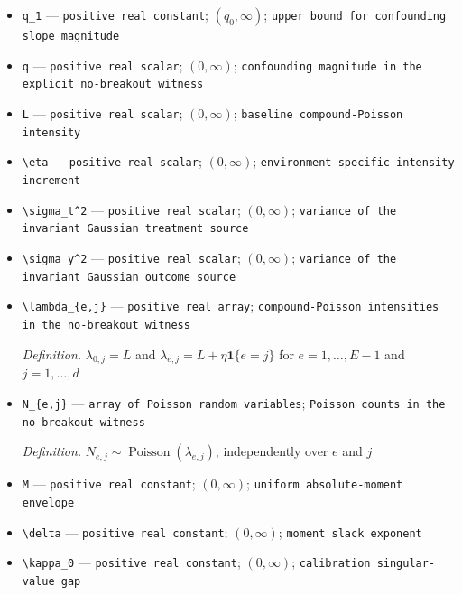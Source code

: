 \documentclass{article}
\begin{document}
\begin{itemize}
  \item \texttt{q\_\allowbreak{}1} --- \texttt{positive real constant}; \((q_0,\infty)\); \texttt{upper bound for confounding slope magnitude}
  \item \texttt{q} --- \texttt{positive real scalar}; \((0,\infty)\); \texttt{confounding magnitude in the explicit no-\allowbreak{}breakout witness}
  \item \texttt{L} --- \texttt{positive real scalar}; \((0,\infty)\); \texttt{baseline compound-\allowbreak{}Poisson intensity}
  \item \texttt{\textbackslash{}\allowbreak{}eta} --- \texttt{positive real scalar}; \((0,\infty)\); \texttt{environment-\allowbreak{}specific intensity increment}
  \item \texttt{\textbackslash{}\allowbreak{}sigma\_\allowbreak{}t\textasciicircum{}2} --- \texttt{positive real scalar}; \((0,\infty)\); \texttt{variance of the invariant Gaussian treatment source}
  \item \texttt{\textbackslash{}\allowbreak{}sigma\_\allowbreak{}y\textasciicircum{}2} --- \texttt{positive real scalar}; \((0,\infty)\); \texttt{variance of the invariant Gaussian outcome source}
  \item \texttt{\textbackslash{}\allowbreak{}lambda\_\allowbreak{}\{e,\allowbreak{}j\}\allowbreak{}} --- \texttt{positive real array}; \texttt{compound-\allowbreak{}Poisson intensities in the no-\allowbreak{}breakout witness}
  \par\smallskip\noindent\emph{Definition.} \(\lambda_{0,j}=L\) and \(\lambda_{e,j}=L+\eta\mathbf 1\{e=j\}\) for \(e=1,\ldots,E-1\) and \(j=1,\ldots,d\)
  \item \texttt{N\_\allowbreak{}\{e,\allowbreak{}j\}\allowbreak{}} --- \texttt{array of Poisson random variables}; \texttt{Poisson counts in the no-\allowbreak{}breakout witness}
  \par\smallskip\noindent\emph{Definition.} \(N_{e,j}\sim\operatorname{Poisson}(\lambda_{e,j})\), independently over \(e\) and \(j\)
  \item \texttt{M} --- \texttt{positive real constant}; \((0,\infty)\); \texttt{uniform absolute-\allowbreak{}moment envelope}
  \item \texttt{\textbackslash{}\allowbreak{}delta} --- \texttt{positive real constant}; \((0,\infty)\); \texttt{moment slack exponent}
  \item \texttt{\textbackslash{}\allowbreak{}kappa\_\allowbreak{}0} --- \texttt{positive real constant}; \((0,\infty)\); \texttt{calibration singular-\allowbreak{}value gap}

\end{itemize}
\end{document}
